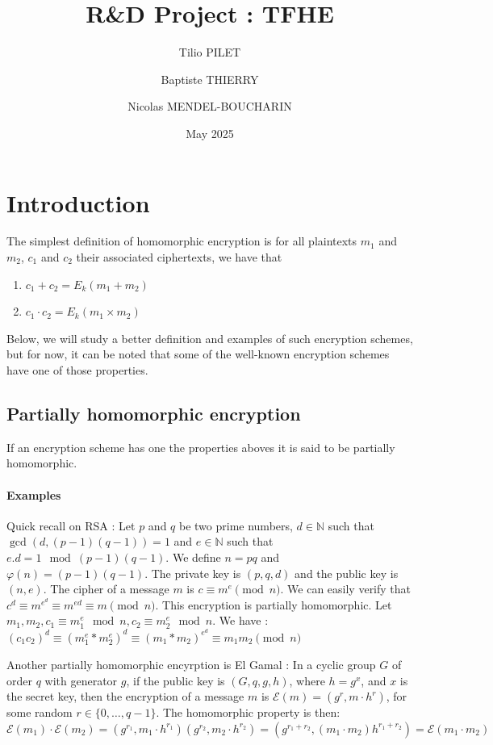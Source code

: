 \documentclass{article}
\title{R\&D Project : TFHE}
\author{Tilio PILET
\and
Baptiste THIERRY
\and
Nicolas MENDEL-BOUCHARIN
}
\date{May 2025}
\newcommand{\N}{\mathbb{N}}
\theoremstyle{definition}
\theoremstyle{Theorem}
\begin{document}
\maketitle
\tableofcontents
\newpage
\section{Introduction}

The simplest definition of homomorphic encryption is for all plaintexts $m_1$ and $m_2$, $c_1$ and $c_2$ their associated ciphertexts, we have that 
\begin{enumerate}
    \item $c_1 + c_2 = E_k(m_1 + m_2)$
    \item $c_1 \cdot c_2 = E_k(m_1 \times m_2)$
\end{enumerate}

Below, we will study a better definition and examples of such encryption schemes, but for now, it can be noted that some of the well-known encryption schemes have one of those properties.


\subsection{Partially homomorphic encryption}
If an encryption scheme has one the properties aboves it is said to be partially homomorphic.


\paragraph{Examples}

Quick recall on RSA : Let $p$ and $q$ be two prime numbers, $d \in \N$ such that $\gcd(d,(p-1)(q-1)) = 1$ and $e\in\N$ such that $e.d = 1 \mod (p-1)(q-1)$. We define $n = pq$ and $\varphi(n) = (p-1)(q-1)$. The private key is $(p,q,d)$ and the public key is $(n,e)$. The cipher of a message $m$ is $c\equiv m^e \pmod n $. We can easily verify that $c^d\equiv m^{e^d} \equiv m^{ed}\equiv m \pmod{n}$. This encryption is partially homomorphic. Let $m_1, m_2, c_1 \equiv m_1^e \mod n, c_2\equiv m_2^e \mod n$. We have : $(c_1c_2)^d \equiv (m_1^e * m_2^e)^d \equiv (m_1*m_2)^{e^d}\equiv m_1m_2 \pmod n$ 

Another partially homomorphic encyrption is El Gamal : In a cyclic group $G$ of order $q$ with generator $g$, if the public key is $(G, q, g, h)$, where $h = g^x$, and $x$ is the secret key, then the encryption of a message $m$ is $\mathcal{E}(m) = (g^r,m\cdot h^r)$, for some random $r \in \{0, \ldots, q-1\}$. The homomorphic property is then: $\mathcal{E}(m_1) \cdot \mathcal{E}(m_2) = (g^{r_1},m_1\cdot h^{r_1})(g^{r_2},m_2 \cdot h^{r_2}) = (g^{r_1+r_2},(m_1\cdot m_2) h^{r_1+r_2}) = \mathcal{E}(m_1 \cdot m_2)$
\end{document}
